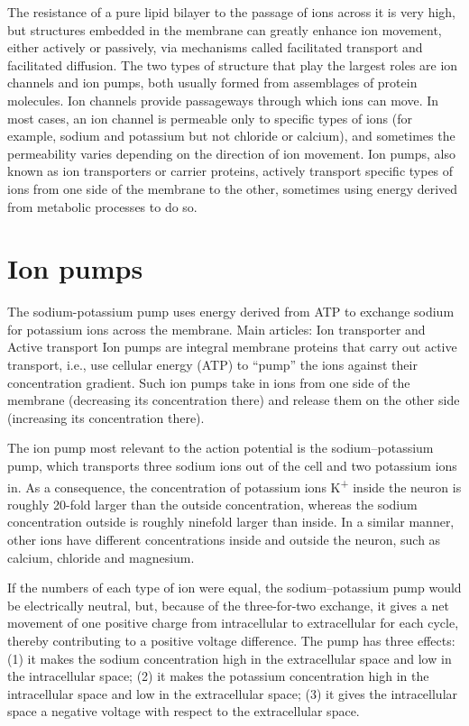 \documentclass[]{book}
\begin{document}
The resistance of a pure lipid bilayer to the passage of ions across it is very high, but structures embedded in the membrane can greatly enhance ion movement, either actively or passively, via mechanisms called facilitated transport and facilitated diffusion. The two types of structure that play the largest roles are ion channels and ion pumps, both usually formed from assemblages of protein molecules. Ion channels provide passageways through which ions can move. In most cases, an ion channel is permeable only to specific types of ions (for example, sodium and potassium but not chloride or calcium), and sometimes the permeability varies depending on the direction of ion movement. Ion pumps, also known as ion transporters or carrier proteins, actively transport specific types of ions from one side of the membrane to the other, sometimes using energy derived from metabolic processes to do so.

\hypertarget{ion-pumps}{%
\section{Ion pumps}\label{ion-pumps}}

The sodium-potassium pump uses energy derived from ATP to exchange sodium for potassium ions across the membrane.
Main articles: Ion transporter and Active transport
Ion pumps are integral membrane proteins that carry out active transport, i.e., use cellular energy (ATP) to ``pump'' the ions against their concentration gradient. Such ion pumps take in ions from one side of the membrane (decreasing its concentration there) and release them on the other side (increasing its concentration there).

The ion pump most relevant to the action potential is the sodium--potassium pump, which transports three sodium ions out of the cell and two potassium ions in. As a consequence, the concentration of potassium ions K\textsuperscript{+} inside the neuron is roughly 20-fold larger than the outside concentration, whereas the sodium concentration outside is roughly ninefold larger than inside. In a similar manner, other ions have different concentrations inside and outside the neuron, such as calcium, chloride and magnesium.

If the numbers of each type of ion were equal, the sodium--potassium pump would be electrically neutral, but, because of the three-for-two exchange, it gives a net movement of one positive charge from intracellular to extracellular for each cycle, thereby contributing to a positive voltage difference. The pump has three effects: (1) it makes the sodium concentration high in the extracellular space and low in the intracellular space; (2) it makes the potassium concentration high in the intracellular space and low in the extracellular space; (3) it gives the intracellular space a negative voltage with respect to the extracellular space.
\end{document}
